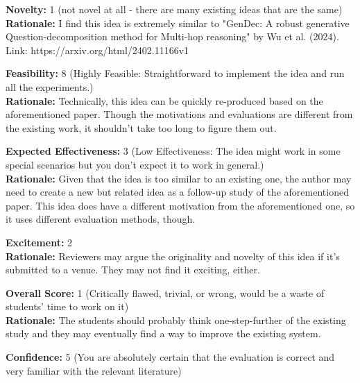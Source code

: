 \newpage 


\begin{tcolorbox}[colback=green!10!white, colframe=green!80!black, title=\textbf{Reviewer 1}]
\small
\textbf{Novelty:} 1 (not novel at all - there are many existing ideas that are the same)\\
\textbf{Rationale:} I find this idea is extremely similar to "GenDec: A robust generative Question-decomposition method for Multi-hop reasoning" by Wu et al. (2024). Link: https://arxiv.org/html/2402.11166v1

\vspace{10pt}

\textbf{Feasibility:} 8 (Highly Feasible: Straightforward to implement the idea and run all the experiments.)\\
\textbf{Rationale:} Technically, this idea can be quickly re-produced based on the aforementioned paper. Though the motivations and evaluations are different from the existing work, it shouldn't take too long to figure them out.

\vspace{10pt}

\textbf{Expected Effectiveness:} 3 (Low Effectiveness: The idea might work in some special scenarios but you don't expect it to work in general.)\\
\textbf{Rationale:} Given that the idea is too similar to an existing one, the author may need to create a new but related idea as a follow-up study of the aforementioned paper. This idea does have a different motivation from the aforementioned one, so it uses different evaluation methods, though.

\vspace{10pt}

\textbf{Excitement:} 2\\
\textbf{Rationale:} Reviewers may argue the originality and novelty of this idea if it's submitted to a venue. They may not find it exciting, either.

\vspace{10pt}

\textbf{Overall Score:} 1 (Critically flawed, trivial, or wrong, would be a waste of students’ time to work on it)\\
\textbf{Rationale:} The students should probably think one-step-further of the existing study and they may eventually find a way to improve the existing system.

\vspace{10pt}

\textbf{Confidence:} 5 (You are absolutely certain that the evaluation is correct and very familiar with the relevant literature)
\end{tcolorbox}

